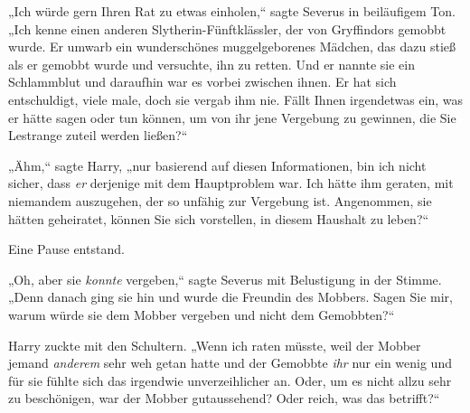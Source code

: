 „Ich würde gern Ihren Rat zu etwas einholen,“ sagte Severus in beiläufigem Ton. „Ich kenne einen anderen Slytherin-Fünftklässler, der von Gryffindors gemobbt wurde. Er umwarb ein wunderschönes muggelgeborenes Mädchen, das dazu stieß als er gemobbt wurde und versuchte, ihn zu retten. Und er nannte sie ein Schlammblut und daraufhin war es vorbei zwischen ihnen. Er hat sich entschuldigt, viele male, doch sie vergab ihm nie. Fällt Ihnen irgendetwas ein, was er hätte sagen oder tun können, um von ihr jene Vergebung zu gewinnen, die Sie Lestrange zuteil werden ließen?“

„Ähm,“ sagte Harry, „nur basierend auf diesen Informationen, bin ich nicht sicher, dass \emph{er} derjenige mit dem Hauptproblem war. Ich hätte ihm geraten, mit niemandem auszugehen, der so unfähig zur Vergebung ist. Angenommen, sie hätten geheiratet, können Sie sich vorstellen, in diesem Haushalt zu leben?“

Eine Pause entstand.

„Oh, aber sie \emph{konnte} vergeben,“ sagte Severus mit Belustigung in der Stimme. „Denn danach ging sie hin und wurde die Freundin des Mobbers. Sagen Sie mir, warum würde sie dem Mobber vergeben und nicht dem Gemobbten?“

Harry zuckte mit den Schultern. „Wenn ich raten müsste, weil der Mobber jemand \emph{anderem} sehr weh getan hatte und der Gemobbte \emph{ihr} nur ein wenig und für sie fühlte sich das irgendwie unverzeihlicher an. Oder, um es nicht allzu sehr zu beschönigen, war der Mobber gutaussehend? Oder reich, was das betrifft?“

